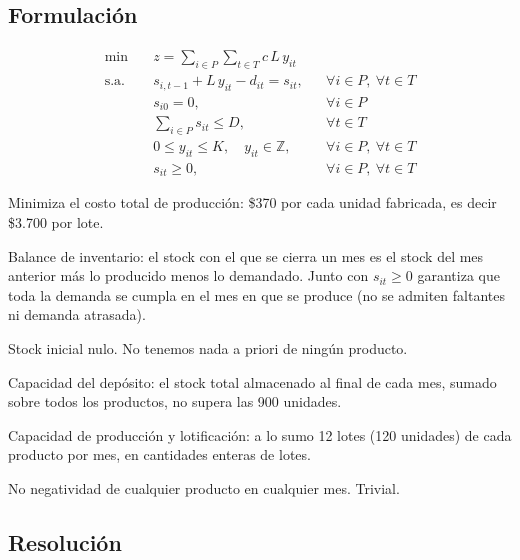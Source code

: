 \documentclass[11pt,a4paper]{article}
\begin{document}
\subsection*{Formulación}

\begin{align}
  \min\quad & z = \sum_{i\in P}\sum_{t\in T} c\,L\,y_{it}
  \label{eq:obj}\\[2pt]
  \text{s.a.}\quad
  & s_{i,t-1} + L\,y_{it} - d_{it} = s_{it},
  && \forall i \in P,\ \forall t \in T
  \label{eq:balance}\\
  & s_{i0} = 0,
  && \forall i \in P
  \label{eq:inicial}\\
  & \sum_{i \in P} s_{it} \le D,
  && \forall t \in T
  \label{eq:deposito}\\
  & 0 \le y_{it} \le K, \quad y_{it} \in \mathbb{Z},
  && \forall i \in P,\ \forall t \in T
  \label{eq:capacidad}\\
  & s_{it} \ge 0,
  && \forall i \in P,\ \forall t \in T
  \label{eq:nonneg}
\end{align}

\begin{description}[leftmargin=1.6cm,style=nextline,itemsep=2pt]
  \item[\eqref{eq:obj}] Minimiza el costo total de producción: \$370 por cada
    unidad fabricada, es decir \$3.700 por lote.
  \item[\eqref{eq:balance}] Balance de inventario: el stock con el que se cierra
    un mes es el stock del mes anterior más lo producido menos lo demandado.
    Junto con $s_{it}\ge 0$ garantiza que toda la demanda se cumpla en el mes en
    que se produce (no se admiten faltantes ni demanda atrasada).
  \item[\eqref{eq:inicial}] Stock inicial nulo. No tenemos nada a priori de ningún producto.
  \item[\eqref{eq:deposito}] Capacidad del depósito: el stock total almacenado
    al final de cada mes, sumado sobre todos los productos, no supera las 900
    unidades.
  \item[\eqref{eq:capacidad}] Capacidad de producción y lotificación: a lo sumo
    12 lotes (120 unidades) de cada producto por mes, en cantidades enteras de
    lotes.
  \item [\eqref{eq:nonneg}] No negatividad de cualquier producto en cualquier mes. Trivial.
\end{description}

\subsection*{Resolución}
\end{document}
